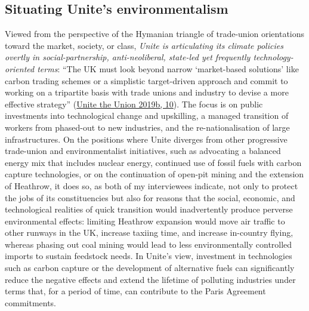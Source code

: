 \documentclass[a4paper, nobind]{templates/ociamthesis}
\begin{document}
\hypertarget{situating-unites-environmentalism}{%
\subsection{Situating Unite's environmentalism}\label{situating-unites-environmentalism}}

Viewed from the perspective of the Hymanian triangle of trade-union orientations toward the market, society, or class, \emph{Unite is articulating its climate policies overtly in social-partnership, anti-neoliberal, state-led yet frequently technology-oriented terms}: ``The UK must look beyond narrow `market-based solutions' like carbon trading schemes or a simplistic target-driven approach and commit to working on a tripartite basis with trade unions and industry to devise a more effective strategy'' (\protect\hyperlink{ref-unite_the_union_tackling_2019}{Unite the Union 2019b, 10}). The focus is on public investments into technological change and upskilling, a managed transition of workers from phased-out to new industries, and the re-nationalisation of large infrastructures. On the positions where Unite diverges from other progressive trade-union and environmentalist initiatives, such as advocating a balanced energy mix that includes nuclear energy, continued use of fossil fuels with carbon capture technologies, or on the continuation of open-pit mining and the extension of Heathrow, it does so, as both of my interviewees indicate, not only to protect the jobs of its constituencies but also for reasons that the social, economic, and technological realities of quick transition would inadvertently produce perverse environmental effects: limiting Heathrow expansion would move air traffic to other runways in the UK, increase taxiing time, and increase in-country flying, whereas phasing out coal mining would lead to less environmentally controlled imports to sustain feedstock needs. In Unite's view, investment in technologies such as carbon capture or the development of alternative fuels can significantly reduce the negative effects and extend the lifetime of polluting industries under terms that, for a period of time, can contribute to the Paris Agreement commitments.
\end{document}
